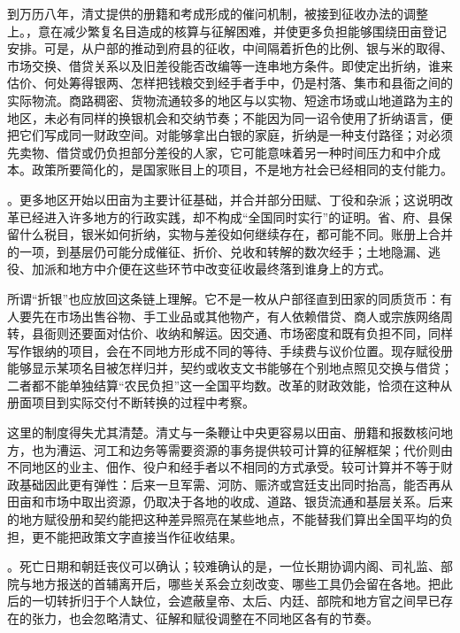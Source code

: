 到万历八年，清丈提供的册籍和考成形成的催问机制，被接到征收办法的调整上。，意在减少繁复名目造成的核算与征解困难，并使更多负担能够围绕田亩登记安排。可是，从户部的推动到府县的征收，中间隔着折色的比例、银与米的取得、市场交换、借贷关系以及旧差役能否改编等一连串地方条件。即使定出折纳，谁来估价、何处筹得银两、怎样把钱粮交到经手者手中，仍是村落、集市和县衙之间的实际物流。商路稠密、货物流通较多的地区与以实物、短途市场或山地道路为主的地区，未必有同样的换银机会和交纳节奏；不能因为同一诏令使用了折纳语言，便把它们写成同一财政空间。对能够拿出白银的家庭，折纳是一种支付路径；对必须先卖物、借贷或仍负担部分差役的人家，它可能意味着另一种时间压力和中介成本。政策所要简化的，是国家账目上的项目，不是地方社会已经相同的支付能力。

。更多地区开始以田亩为主要计征基础，并合并部分田赋、丁役和杂派；这说明改革已经进入许多地方的行政实践，却不构成“全国同时实行”的证明。省、府、县保留什么税目，银米如何折纳，实物与差役如何继续存在，都可能不同。账册上合并的一项，到基层仍可能分成催征、折价、兑收和转解的数次经手；土地隐漏、逃役、加派和地方中介便在这些环节中改变征收最终落到谁身上的方式。

所谓“折银”也应放回这条链上理解。它不是一枚从户部径直到田家的同质货币：有人要先在市场出售谷物、手工业品或其他物产，有人依赖借贷、商人或宗族网络周转，县衙则还要面对估价、收纳和解运。因交通、市场密度和既有负担不同，同样写作银纳的项目，会在不同地方形成不同的等待、手续费与议价位置。现存赋役册能够显示某项名目被怎样归并，契约或收支文书能够在个别地点照见交换与借贷；二者都不能单独结算“农民负担”这一全国平均数。改革的财政效能，恰须在这种从册面项目到实际交付不断转换的过程中考察。

这里的制度得失尤其清楚。清丈与一条鞭让中央更容易以田亩、册籍和报数核问地方，也为漕运、河工和边务等需要资源的事务提供较可计算的征解框架；代价则由不同地区的业主、佃作、役户和经手者以不相同的方式承受。较可计算并不等于财政基础因此更有弹性：后来一旦军需、河防、赈济或宫廷支出同时抬高，能否再从田亩和市场中取出资源，仍取决于各地的收成、道路、银货流通和基层关系。后来的地方赋役册和契约能把这种差异照亮在某些地点，不能替我们算出全国平均的负担，更不能把政策文字直接当作征收结果。

。死亡日期和朝廷丧仪可以确认；较难确认的是，一位长期协调内阁、司礼监、部院与地方报送的首辅离开后，哪些关系会立刻改变、哪些工具仍会留在各地。把此后的一切转折归于个人缺位，会遮蔽皇帝、太后、内廷、部院和地方官之间早已存在的张力，也会忽略清丈、征解和赋役调整在不同地区各有的节奏。

